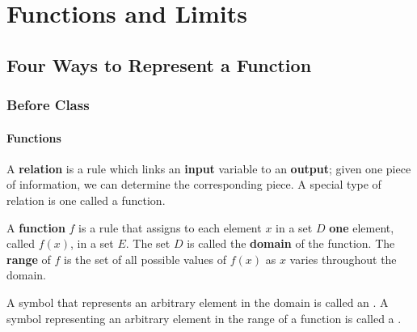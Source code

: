 \documentclass[notes]{subfiles}
\begin{document}
	\chapter{Functions and Limits}
	\setcounter{section}{1}
	\setcounter{page}{1}
	\fancyhead[LO,RE]{\bfseries \currentname}
	\fancyfoot[C]{{}}
	\fancyfoot[RO,LE]{\large \thepage}	%

\section*{Four Ways to Represent a Function}\label{cs11}
	\subsection*{Before Class}
	\subsubsection*{Functions}
		A \textbf{relation} is a rule which links an \textbf{input} variable to an \textbf{output}; given one piece of information, we can determine the corresponding piece.  A special type of relation is one called a function.
			\vspace{.25in}
			
		\begin{defn}
			A \textbf{function} $f$ is a rule that assigns to each element $x$ in a set $D$ \textbf{one} element, called $f(x)$, in a set $E$.  The set $D$ is called the \textbf{domain} of the function.  The \textbf{range} of $f$ is the set of all possible values of $f(x)$ as $x$ varies throughout the domain. 
		\end{defn}	
		
		\begin{defn}
			A symbol that represents an arbitrary element in the domain is called an  .  A symbol representing an arbitrary element in the range of a function is called a  .
		\end{defn}
			\newpage
			
\end{document}
